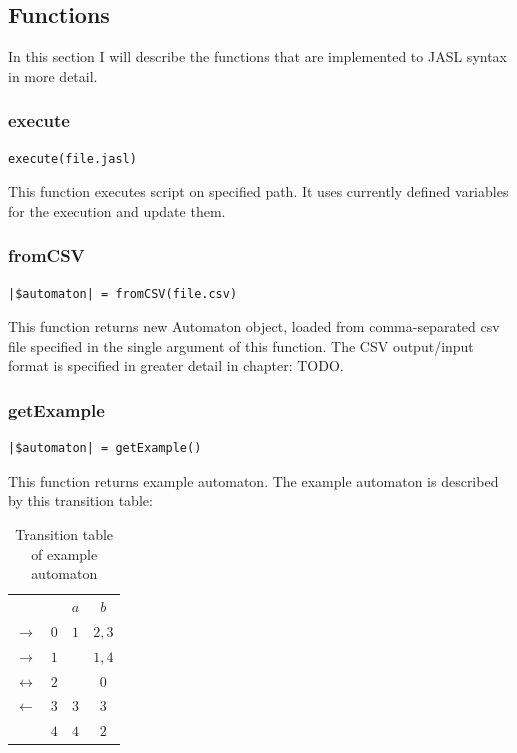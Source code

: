 \documentclass{ctuthesis}
\begin{document}
\subsection{Functions}
In this section I will describe the functions that are implemented to JASL syntax in more detail.

\subsubsection{execute}
\label{subsec:execute}
\begin{lstlisting}[language = JASL_snippet]
	execute(file.jasl)
\end{lstlisting}

This function executes script on specified path. It uses currently defined variables for the execution and update them.

\subsubsection{fromCSV}
\begin{lstlisting}[language = JASL_snippet]
	|$automaton| = fromCSV(file.csv)
\end{lstlisting}

This function returns new Automaton object, loaded from comma-separated csv file specified in the single argument of this function. The CSV output/input format is specified in greater detail in chapter: TODO.

\subsubsection{getExample}
\begin{lstlisting}[language = JASL_snippet]
	|$automaton| = getExample()
\end{lstlisting}

This function returns example automaton. The example automaton is described by this transition table:
\begin{table}[H]
\begin{ctucolortab}
\begin{tabular}{cc|c|c}
	 & & $a$ & $b$ \\\Midrule
	$\rightarrow$ & $0$ & $1$ & $2,3$ \\
	$\rightarrow$ & $1$ & & $1,4$ \\
	$\leftrightarrow$ & $2$ & & $0$ \\
	$\leftarrow$ & $3$ & $3$ & $3$ \\
	 & $4$ & $4$ & $2$ 
\end{tabular}
\end{ctucolortab}
\caption{Transition table of example automaton}
\label{fig:example_automaton_table}
\end{table}
\end{document}
